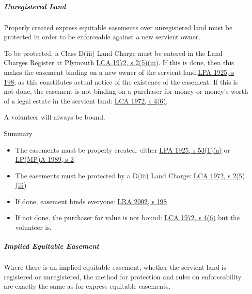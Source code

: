 \documentclass[
]{article}
\providecommand{\tightlist}{%
  \setlength{\itemsep}{0pt}\setlength{\parskip}{0pt}}
\newenvironment{env-d6ce83a0-f7a8-46b6-be95-b1235f1feb63}
{
    \savenotes\tcolorbox[blanker,breakable,left=5pt,borderline west={2pt}{-4pt}{gray}]
}
{
    \endtcolorbox\spewnotes
}
\begin{document}
\hypertarget{unregistered-land-2}{%
\subparagraph{Unregistered Land}\label{unregistered-land-2}}

Properly created express equitable easements over unregistered land must
be protected in order to be enforceable against a new servient owner.

To be protected, a Class D(iii) Land Charge must be entered in the Land
Charges Register at Plymouth
\href{https://www.legislation.gov.uk/ukpga/1972/61/section/2}{LCA 1972,
s 2(5)(iii)}. If this is done, then this makes the easement binding on a
new owner of the servient
land,\href{https://www.legislation.gov.uk/ukpga/Geo5/15-16/20/section/198}{LPA
1925, s 198}, as this constitutes actual notice of the existence of the
easement. If this is not done, the easement is not binding on a
purchaser for money or money's worth of a legal estate in the servient
land: \href{https://www.legislation.gov.uk/ukpga/1972/61/section/4}{LCA
1972, s 4(6)}.

A volunteer will always be bound.

\begin{env-d6ce83a0-f7a8-46b6-be95-b1235f1feb63}

Summary

\begin{itemize}
\tightlist
\item
  The easements must be properly created: either
  \href{https://www.legislation.gov.uk/ukpga/Geo5/15-16/20/section/53}{LPA
  1925, s 53(1)(a)} or
  \href{https://www.legislation.gov.uk/ukpga/1989/34/section/2}{LP(MP)A
  1989, s 2}
\item
  The easements must be protected by a D(iii) Land Charge:
  \href{https://www.legislation.gov.uk/ukpga/1972/61/section/2}{LCA
  1972, s 2(5)(iii)}
\item
  If done, easement binds everyone:
  \href{https://www.legislation.gov.uk/ukpga/2002/9/section/198}{LRA
  2002, s 198}
\item
  If not done, the purchaser for value is not bound:
  \href{https://www.legislation.gov.uk/ukpga/1972/61/section/4}{LCA
  1972, s 4(6)} but the volunteer is.
\end{itemize}

\end{env-d6ce83a0-f7a8-46b6-be95-b1235f1feb63}

\hypertarget{implied-equitable-easement}{%
\subparagraph{Implied Equitable
Easement}\label{implied-equitable-easement}}

Where there is an implied equitable easement, whether the servient land
is registered or unregistered, the method for protection and rules on
enforceability are exactly the same as for express equitable easements.
\end{document}

